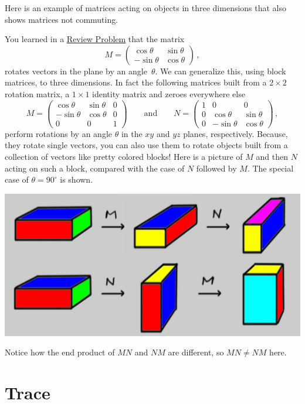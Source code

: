 Here is an example of matrices acting on objects in three dimensions that also shows matrices not commuting.
\begin{example}
You learned in a \hyperlink{rotationprob}{Review Problem} that the matrix
\[M=\begin{pmatrix}\cos\theta & \sin\theta \\ -\sin \theta & \cos\theta\end{pmatrix}\, ,\]
rotates vectors in the plane by an angle~$\theta$. 
We can generalize this, using block matrices, to three dimensions.
In fact the following matrices built from a $2\times 2$ rotation matrix, a $1\times 1$ identity matrix and zeroes everywhere else
\[
M=\begin{pmatrix}\cos\theta & \sin\theta &0\\ -\sin \theta & \cos\theta&0\\0&0&1\end{pmatrix}\qquad\mbox{and}\qquad
N=\begin{pmatrix}1&0&0\\0&\cos\theta & \sin\theta \\ 0&-\sin \theta & \cos\theta\end{pmatrix}\, ,
\]
perform rotations by an angle $\theta$ in the $xy$ and $yz$ planes, respectively. Because, they rotate single vectors, you can also use them to rotate objects built from a collection of vectors like pretty colored blocks! Here is a picture of $M$ and then $N$ acting on such a block, compared with the case of $N$ followed by $M$. The special case of $\theta=90^\circ$ is shown.
\begin{center}
\includegraphics[scale=.3]{MNNM.jpg}
\end{center}
Notice how the end product of $MN$ and $NM$ are different, so $MN\neq NM$ here.
\end{example}

\section*{Trace}

